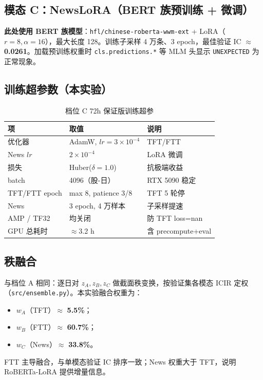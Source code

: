 \documentclass[UTF8,a4paper,12pt]{ctexart}
\begin{document}
\subsection{模态 C：NewsLoRA（BERT 族预训练 + 微调）}

\textbf{此处使用 BERT 族模型}：\texttt{hfl/chinese-roberta-wwm-ext} + LoRA（$r=8,\alpha=16$），最大长度 128。训练子采样 4 万条、3 epoch，最佳验证 IC $\approx$ \textbf{0.0261}。加载预训练权重时 \texttt{cls.predictions.*} 等 MLM 头显示 \texttt{UNEXPECTED} 为正常现象。

\subsection{训练超参数（本实验）}

\begin{table}[H]
\centering
\caption{档位 C 72h 保证版训练超参}
\label{tab:hyper-c}
\begin{tabular}{llp{5.5cm}}
\toprule
\textbf{项} & \textbf{取值} & \textbf{说明} \\
\midrule
优化器 & AdamW, $lr=3\times 10^{-4}$ & TFT/FTT \\
News $lr$ & $2\times 10^{-4}$ & LoRA 微调 \\
损失 & Huber($\delta=1.0$) & 抗极端收益 \\
batch & 4096（股-日） & RTX 5090 稳定 \\
TFT/FTT epoch & max 8, patience 3/8 & TFT 5 轮停 \\
News & 3 epoch, 4 万样本 & 子采样提速 \\
AMP / TF32 & 均关闭 & 防 TFT loss=nan \\
GPU 总耗时 & $\approx$3.2 h & 含 precompute+eval \\
\bottomrule
\end{tabular}
\end{table}

\subsection{秩融合}

与档位 A 相同：逐日对 $z_A,z_B,z_C$ 做截面秩变换，按验证集各模态 ICIR 定权（\texttt{src/ensemble.py}）。本实验融合权重为：
\begin{itemize}[leftmargin=2em]
  \item $w_A$（TFT）$\approx$ \textbf{5.5\%}；
  \item $w_B$（FTT）$\approx$ \textbf{60.7\%}；
  \item $w_C$（News）$\approx$ \textbf{33.8\%}。
\end{itemize}
FTT 主导融合，与单模态验证 IC 排序一致；News 权重大于 TFT，说明 RoBERTa-LoRA 提供增量信息。
\end{document}
